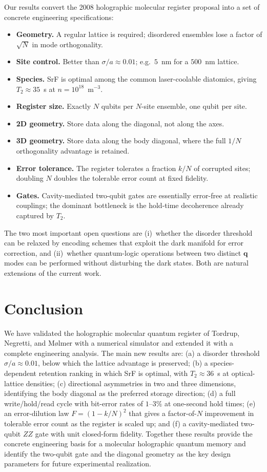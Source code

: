 \documentclass[11pt]{article}
\begin{document}
Our results convert the 2008 holographic molecular register proposal
into a set of concrete engineering specifications:
\begin{itemize}
  \item \textbf{Geometry.} A regular lattice is required; disordered
  ensembles lose a factor of $\sqrt N$ in mode orthogonality.
  \item \textbf{Site control.} Better than $\sigma/a \approx 0.01$;
  e.g.\ $5$~nm for a $500$~nm lattice.
  \item \textbf{Species.} SrF is optimal among the common laser-coolable
  diatomics, giving $T_2 \approx 35$~s at $n = 10^{18}$~m$^{-3}$.
  \item \textbf{Register size.} Exactly $N$ qubits per $N$-site
  ensemble, one qubit per site.
  \item \textbf{2D geometry.} Store data along the diagonal, not along
  the axes.
  \item \textbf{3D geometry.} Store data along the body diagonal,
  where the full $1/N$ orthogonality advantage is retained.
  \item \textbf{Error tolerance.} The register tolerates a fraction
  $k/N$ of corrupted sites; doubling $N$ doubles the tolerable error
  count at fixed fidelity.
  \item \textbf{Gates.} Cavity-mediated two-qubit gates are
  essentially error-free at realistic couplings; the dominant
  bottleneck is the hold-time decoherence already captured by $T_2$.
\end{itemize}

The two most important open questions are (i)~whether the disorder
threshold can be relaxed by encoding schemes that exploit the dark
manifold for error correction, and (ii)~whether quantum-logic operations
between two distinct $\mathbf q$ modes can be performed without
disturbing the dark states. Both are natural extensions of the current
work.

\section{Conclusion}

We have validated the holographic molecular quantum register of
Tordrup, Negretti, and M\o lmer with a numerical simulator and extended
it with a complete engineering analysis. The main new results are:
(a) a disorder threshold $\sigma/a \approx 0.01$, below which the
lattice advantage is preserved; (b) a species-dependent retention
ranking in which SrF is optimal, with $T_2 \approx 36$~s at
optical-lattice densities; (c) directional asymmetries in two and
three dimensions, identifying the body diagonal as the preferred
storage direction; (d) a full write/hold/read cycle with bit-error
rates of $1$--$3\%$ at one-second hold times; (e) an error-dilution
law $F = (1-k/N)^2$ that gives a factor-of-$N$ improvement in
tolerable error count as the register is scaled up; and (f) a
cavity-mediated two-qubit $ZZ$ gate with unit closed-form fidelity.
Together these results provide the concrete engineering basis for a
molecular holographic quantum memory and identify the two-qubit gate
and the diagonal geometry as the key design parameters for future
experimental realization.
\end{document}
